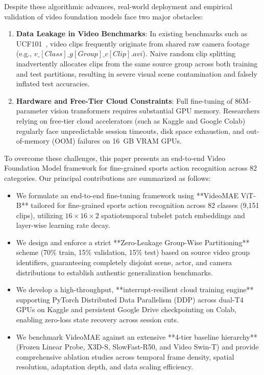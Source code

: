 Despite these algorithmic advances, real-world deployment and empirical validation of video foundation models face two major obstacles:
\begin{enumerate}
    \item \textbf{Data Leakage in Video Benchmarks}: In existing benchmarks such as UCF101~\cite{soomro2012ucf101}, video clips frequently originate from shared raw camera footage (e.g., $v\_[Class]\_g[Group]\_c[Clip].avi$). Naive random clip splitting inadvertently allocates clips from the same source group across both training and test partitions, resulting in severe visual scene contamination and falsely inflated test accuracies.
    \item \textbf{Hardware and Free-Tier Cloud Constraints}: Full fine-tuning of 86M-parameter vision transformers requires substantial GPU memory. Researchers relying on free-tier cloud accelerators (such as Kaggle and Google Colab) regularly face unpredictable session timeouts, disk space exhaustion, and out-of-memory (OOM) failures on 16~GB VRAM GPUs.
\end{enumerate}

To overcome these challenges, this paper presents an end-to-end Video Foundation Model framework for fine-grained sports action recognition across 82 categories. Our principal contributions are summarized as follows:
\begin{itemize}
    \item We formulate an end-to-end fine-tuning framework using **VideoMAE ViT-B** tailored for fine-grained sports action recognition across 82 classes (9,151 clips), utilizing $16 \times 16 \times 2$ spatiotemporal tubelet patch embeddings and layer-wise learning rate decay.
    \item We design and enforce a strict **Zero-Leakage Group-Wise Partitioning** scheme (70\% train, 15\% validation, 15\% test) based on source video group identifiers, guaranteeing completely disjoint scene, actor, and camera distributions to establish authentic generalization benchmarks.
    \item We develop a high-throughput, **interrupt-resilient cloud training engine** supporting PyTorch Distributed Data Parallelism (DDP) across dual-T4 GPUs on Kaggle and persistent Google Drive checkpointing on Colab, enabling zero-loss state recovery across session cuts.
    \item We benchmark VideoMAE against an extensive **4-tier baseline hierarchy** (Frozen Linear Probe, X3D-S, SlowFast-R50, and Video Swin-T) and provide comprehensive ablation studies across temporal frame density, spatial resolution, adaptation depth, and data scaling efficiency.
\end{itemize}
